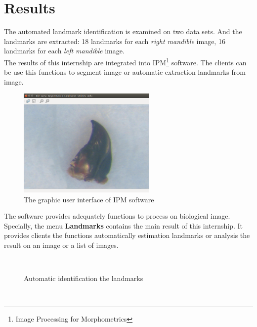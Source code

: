 \section{Results}
The automated landmark identification is examined on two data sets. And the landmarks are extracted: 18 landmarks for each \textit{right mandible} image, 16 landmarks for each \textit{left mandible} image.\\
The results of this internship are integrated into IPM\footnote{Image Processing for Morphometrics} software. The clients can be use this functions to segment image or automatic extraction landmarks from image.\\
\begin{figure}[h!]
\centering
\includegraphics[width=0.6\textwidth]{./images/software}
\caption{The graphic user interface of IPM software}
\label{fig:figure_31}
\end{figure}
The software provides adequately functions to process on biological image. Specially, the menu \textbf{Landmarks} contains the main result of this internship. It provides clients the functions automatically estimation landmarks or analysis the result on an image or a list of images.
\begin{figure}[h!]
\centering
{}~~
\caption{Automatic identification the landmarks}
\label{fig:figure_31}
\end{figure}~\\
